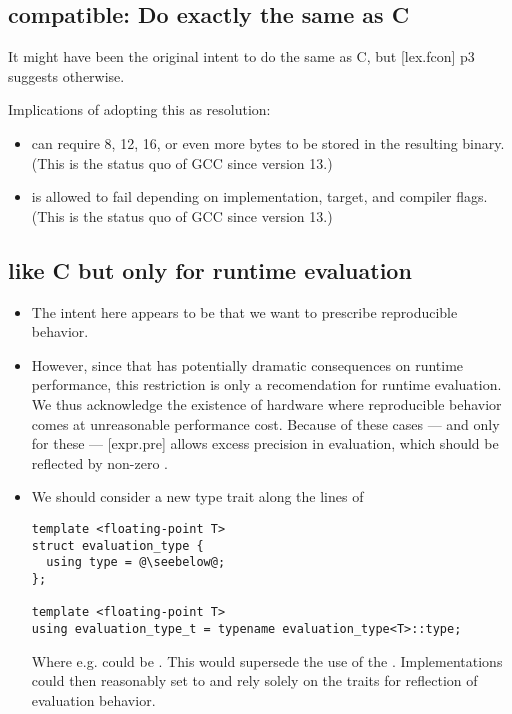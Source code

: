 \subsection{compatible: Do exactly the same as C}\label{d:2}

It might have been the original intent to do the same as C, but [lex.fcon] p3
suggests otherwise.

Implications of adopting this as resolution:
\begin{itemize}
  \item {} can require 8, 12, 16, or even more bytes to be
    stored in the resulting binary.
    (This is the status quo of GCC since version 13.)

  \item {} is allowed to fail
    depending on implementation, target, and compiler flags.
    (This is the status quo of GCC since version 13.)
\end{itemize}

\subsection{like C but only for runtime evaluation}\label{d:3}

\begin{itemize}
  \item The intent here appears to be that we want to prescribe reproducible
    \fp behavior.

  \item However, since that has potentially dramatic consequences on runtime
    performance, this restriction is only a recomendation for runtime
    evaluation.
    We thus acknowledge the existence of hardware where reproducible \fp
    behavior comes at unreasonable performance cost.
    Because of these cases --- and only for these --- [expr.pre] allows excess
    precision in evaluation, which should be reflected by non-zero
    .

  \item We should consider a new type trait along the lines of
    \begin{lstlisting}
template <floating-point T>
struct evaluation_type {
  using type = @\seebelow@;
};

template <floating-point T>
using evaluation_type_t = typename evaluation_type<T>::type;
    \end{lstlisting}
    Where e.g.  could be .
    This would supersede the use of the .
    Implementations could then reasonably set  to
     and rely solely on the traits for reflection of \fp evaluation
    behavior.
\end{itemize}
